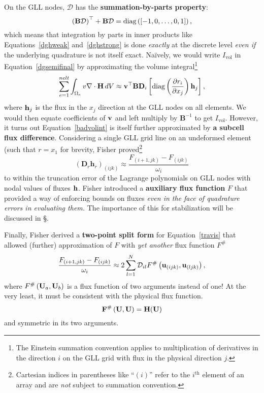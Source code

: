 On the GLL nodes, $\mathcal{D}$ has the \textbf{summation-by-parts property}:
\begin{equation}
\left(\mathbf{B}\mathcal{D}\right)^{\top}+\mathbf{B}\mathcal{D}=\mbox{diag}\left(\left[-1,0,\dots,0,1\right]\right),
\label{SBP}
\end{equation}
which means that integration by parts in inner products like Equations~\ref{dghweak} and~\ref{dghstrong}
is done \emph{exactly} at the discrete level \emph{even if} 
the underlying quadrature is not itself exact.
Na{\"i}vely, we would write $I_{\mbox{vol}}$ in Equation~\ref{dgsemifinal} by
approximating the volume integral\footnote{The Einstein summation convention
applies to multiplication of derivatives in the direction $i$ on the GLL grid with flux in the
physical direction $j$.}
\begin{equation}
\sum_{e=1}^{nelt}\int_{\Omega_e} v \nabla \cdot {\bf H}\, dV \approx
{\bf v}^{\top}\mathbf{B}\mathbf{D}_i\left[\mbox{diag}\left(\frac{\partial r_i}{\partial x_j}\right){\bf h}_j\right],
\label{badvolint}
\end{equation}
where ${\bf h}_j$ is the flux in the $x_j$ direction at the GLL nodes on all elements. We would then equate coefficients of ${\bf v}$ and left multiply by
$\mathbf{B}^{-1}$ to get $I_{\mbox{vol}}$. However, it turns out\cite{CarpenterESSC} Equation~\ref{badvolint}
is itself further approximated by \textbf{a subcell flux difference}. Considering
a single GLL grid line on an undeformed element (such that $r=x_1$ for brevity, Fisher\cite{FisherJCP252}
proved\footnote{Cartesian indices in parentheses like ``$(i)$'' refer to the
$i^{\mbox{th}}$ element of an array and are \emph{not} subject to summation
convention.}
\begin{equation}
\left(\mathbf{D}_r\mathbf{h}_r\right)_{(ijk)}\approx
\frac{F_{(i+1,jk)}-F_{(ijk)}}{\omega_i}
\label{travis}
\end{equation}
to within the truncation error of the Lagrange polynomials on GLL nodes
with nodal values of fluxes ${\bf h}$. Fisher introduced a \textbf{auxiliary flux function} $F$
that provided a way of enforcing bounds on fluxes \emph{even in the face of
quadrature errors in evaluating them.} The importance of this for stabilization
will be discussed in \S.

Finally, Fisher derived a \textbf{two-point split form} for Equation~\ref{travis}
that allowed (further) approximation of $F$ with \emph{yet another} flux function $F^{\#}$
\begin{equation}
\frac{F_{(i+1,jk)}-F_{(ijk)}}{\omega_i}\approx 2
\sum_{l=1}^N\mathcal{D}_{il}F^{\#}\left({\bf u}_{(ijk)},{\bf u}_{(ljk)}\right),
\label{finally2pt}
\end{equation}
where $F^{\#}\left({\bf U}_a,{\bf U}_b\right)$ is a flux function of two arguments instead of one!
At the very least, it must be consistent with the physical flux function.
\begin{equation}
{\bf F}^{\#}\left({\bf U},{\bf U}\right)={\bf H}({\bf U})
\label{consistency}
\end{equation}
and symmetric in its two arguments.

